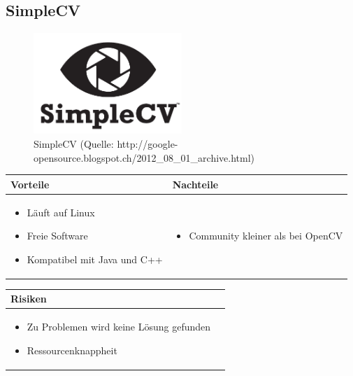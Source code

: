 \pagebreak


\subsection{SimpleCV}
\begin{figure}[h!]%
\centering
\includegraphics[width=0.5\textwidth]{fig/simplecv.png}
\caption{SimpleCV (Quelle: http://google-opensource.blogspot.ch/2012\_08\_01\_archive.html)}
\label{fig:SimpleCV}
\end{figure}

\begin{table}[h]
\begin{tabular}{p{} | p{}}


 \textbf{Vorteile} & \textbf{Nachteile} \\ \hline
	 
\begin{itemize}
\item Läuft auf Linux
\item Freie Software
\item Kompatibel mit Java und C++
\end{itemize}

 &
 
\begin{itemize}
\item Community kleiner als bei OpenCV
\end{itemize}

\end{tabular}
\end{table}

\begin{table}[h]
\begin{tabular}{p{}p{}}


\textbf{Risiken} & \\ \hline
	 
\begin{itemize}
\item Zu Problemen wird keine Lösung gefunden
\item Ressourcenknappheit
\end{itemize}
 
\end{tabular}
\end{table}

\pagebreak
